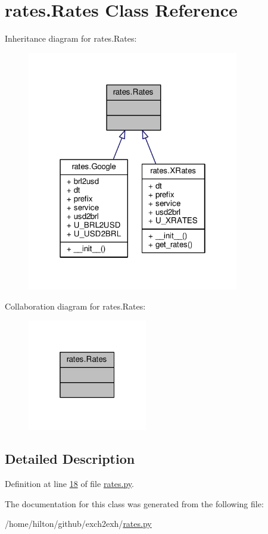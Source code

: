 \hypertarget{classrates_1_1_rates}{}\section{rates.\+Rates Class Reference}
\label{classrates_1_1_rates}


Inheritance diagram for rates.\+Rates\+:\nopagebreak
\begin{figure}[H]
\begin{center}
\leavevmode
\includegraphics[width=262pt]{classrates_1_1_rates__inherit__graph}
\end{center}
\end{figure}


Collaboration diagram for rates.\+Rates\+:\nopagebreak
\begin{figure}[H]
\begin{center}
\leavevmode
\includegraphics[width=148pt]{classrates_1_1_rates__coll__graph}
\end{center}
\end{figure}


\subsection{Detailed Description}


Definition at line \hyperlink{rates_8py_source_l00018}{18} of file \hyperlink{rates_8py_source}{rates.\+py}.



The documentation for this class was generated from the following file\+:\begin{DoxyCompactItemize}
\item 
/home/hilton/github/exch2exh/\hyperlink{rates_8py}{rates.\+py}\end{DoxyCompactItemize}
